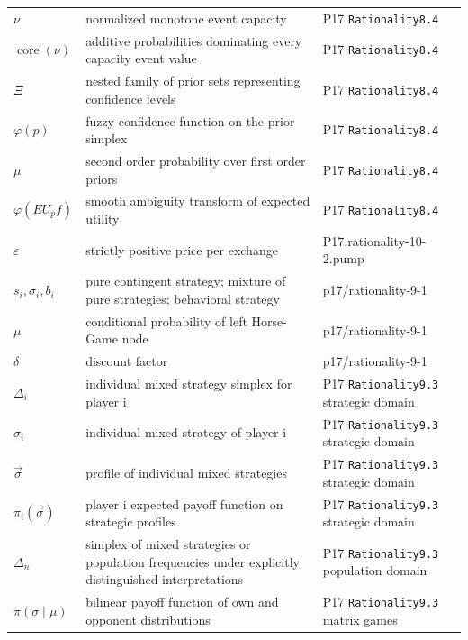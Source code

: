 \begin{longtable}{@{}p{}p{}p{}@{}}
\(\nu\) & normalized monotone event capacity & P17 \texttt{Rationality8.\allowbreak{}4} \\
\(\operatorname{core}(\nu)\) & additive probabilities dominating every capacity event value & P17 \texttt{Rationality8.\allowbreak{}4} \\
\(\Xi\) & nested family of prior sets representing confidence levels & P17 \texttt{Rationality8.\allowbreak{}4} \\
\(\varphi(p)\) & fuzzy confidence function on the prior simplex & P17 \texttt{Rationality8.\allowbreak{}4} \\
\(\mu\) & second order probability over first order priors & P17 \texttt{Rationality8.\allowbreak{}4} \\
\(\varphi(EU_p f)\) & smooth ambiguity transform of expected utility & P17 \texttt{Rationality8.\allowbreak{}4} \\
\(\varepsilon\) & strictly positive price per exchange & P17.\allowbreak{}rationality-\allowbreak{}10-\allowbreak{}2.\allowbreak{}pump \\
\(s_i,\allowbreak \sigma_i,\allowbreak b_i\) & pure contingent strategy; mixture of pure strategies; behavioral strategy & p17/\allowbreak{}rationality-\allowbreak{}9-\allowbreak{}1 \\
\(\mu\) & conditional probability of left Horse-Game node & p17/\allowbreak{}rationality-\allowbreak{}9-\allowbreak{}1 \\
\(\delta\) & discount factor & p17/\allowbreak{}rationality-\allowbreak{}9-\allowbreak{}1 \\
\(\Delta_i\) & individual mixed strategy simplex for player i & P17 \texttt{Rationality9.\allowbreak{}3} strategic domain \\
\(\sigma_i\) & individual mixed strategy of player i & P17 \texttt{Rationality9.\allowbreak{}3} strategic domain \\
\(\vec\sigma\) & profile of individual mixed strategies & P17 \texttt{Rationality9.\allowbreak{}3} strategic domain \\
\(\pi_i(\vec\sigma)\) & player i expected payoff function on strategic profiles & P17 \texttt{Rationality9.\allowbreak{}3} strategic domain \\
\(\Delta_n\) & simplex of mixed strategies or population frequencies under explicitly distinguished interpretations & P17 \texttt{Rationality9.\allowbreak{}3} population domain \\
\(\pi(\sigma\mid\mu)\) & bilinear payoff function of own and opponent distributions & P17 \texttt{Rationality9.\allowbreak{}3} matrix games \\

\end{longtable}
